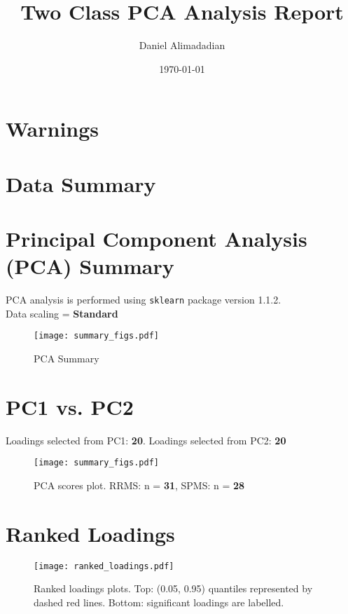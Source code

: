 \documentclass[]{article}
\title{Two Class PCA Analysis Report}
\author{Daniel Alimadadian}
\date{\today}
\begin{document}
\begin{titlepage}
    \maketitle
    \section*{Warnings}
    \section*{Data Summary}
\end{titlepage}

\section*{Principal Component Analysis (PCA) Summary}
    PCA analysis is performed using \texttt{sklearn} package version 1.1.2. \\
    Data scaling = \textbf{Standard}

    \begin{figure}[h!]
        \begin{center}
            \texttt{[image: summary\_figs.pdf]}    
        \end{center}
        \caption{PCA Summary}
    \end{figure}
    
\newpage

\section*{PC1 vs. PC2}
    Loadings selected from PC1: \textbf{20}. Loadings selected from PC2: \textbf{20} 

    \begin{figure}[h!]
        \begin{center}
            \texttt{[image: summary\_figs.pdf]}
        \end{center}
        \caption{PCA scores plot. RRMS: n = \textbf{31}, SPMS: n = \textbf{28}}
    \end{figure}

\newpage

\section*{Ranked Loadings}

    \begin{figure}[h!]
        \begin{center}
            \texttt{[image: ranked\_loadings.pdf]}
        \end{center}
        \caption{Ranked loadings plots. Top: (0.05, 0.95) quantiles
        represented by dashed red lines. Bottom: significant loadings are labelled.}
    \end{figure}
\end{document}
